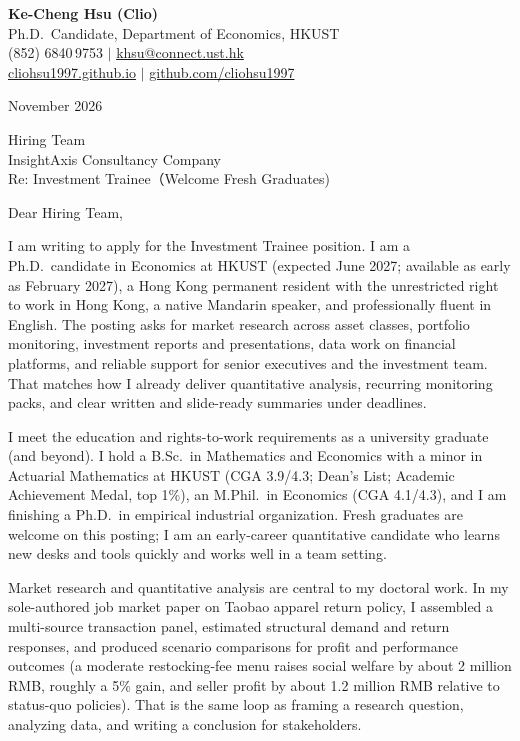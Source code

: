\documentclass[11pt,letterpaper]{article}
\begin{document}
\noindent
{\bfseries Ke-Cheng Hsu (Clio)}\\
Ph.D.\ Candidate, Department of Economics, HKUST\\
(852) 6840\,9753 \quad $|$ \quad \href{mailto:khsu@connect.ust.hk}{khsu@connect.ust.hk}\\
\href{https://cliohsu1997.github.io/}{cliohsu1997.github.io} \quad $|$ \quad \href{https://github.com/cliohsu1997}{github.com/cliohsu1997}

\vspace{0.3em}
 November 2026

\vspace{0.2em}
\noindent
Hiring Team\\
InsightAxis Consultancy Company\\
Re: Investment Trainee（Welcome Fresh Graduates)

\vspace{0.1em}
Dear Hiring Team,

I am writing to apply for the Investment Trainee position. I am a Ph.D.\ candidate in Economics at HKUST (expected June 2027; available as early as February 2027), a Hong Kong permanent resident with the unrestricted right to work in Hong Kong, a native Mandarin speaker, and professionally fluent in English. The posting asks for market research across asset classes, portfolio monitoring, investment reports and presentations, data work on financial platforms, and reliable support for senior executives and the investment team. That matches how I already deliver quantitative analysis, recurring monitoring packs, and clear written and slide-ready summaries under deadlines.

I meet the education and rights-to-work requirements as a university graduate (and beyond). I hold a B.Sc.\ in Mathematics and Economics with a minor in Actuarial Mathematics at HKUST (CGA 3.9/4.3; Dean's List; Academic Achievement Medal, top 1\%), an M.Phil.\ in Economics (CGA 4.1/4.3), and I am finishing a Ph.D.\ in empirical industrial organization. Fresh graduates are welcome on this posting; I am an early-career quantitative candidate who learns new desks and tools quickly and works well in a team setting.

Market research and quantitative analysis are central to my doctoral work. In my sole-authored job market paper on Taobao apparel return policy, I assembled a multi-source transaction panel, estimated structural demand and return responses, and produced scenario comparisons for profit and performance outcomes (a moderate restocking-fee menu raises social welfare by about 2 million RMB, roughly a 5\% gain, and seller profit by about 1.2 million RMB relative to status-quo policies). That is the same loop as framing a research question, analyzing data, and writing a conclusion for stakeholders.
\end{document}
